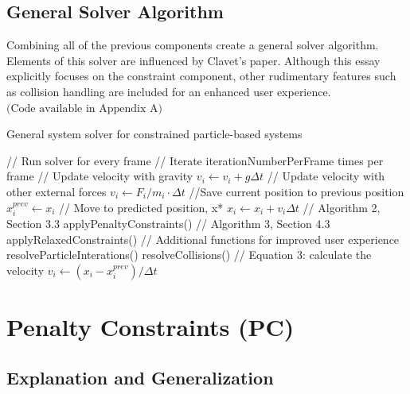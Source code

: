 \documentclass[12pt, letterpaper]{article}
\begin{document}
\subsection{General Solver Algorithm}
Combining all of the previous components create a general solver algorithm. Elements of this solver are influenced by Clavet’s paper. Although this essay explicitly focuses on the constraint component, other rudimentary features such as collision handling are included for an enhanced user experience. $\text{(Code available in Appendix A)}$
\begin{algorithm}[H]
\caption{General system solver for constrained particle-based systems}
\begin{algorithmic}[1]
\STATE // Run solver for every frame
\LOOP 
    \STATE // Iterate iterationNumberPerFrame times per frame
            \STATE // Update velocity with gravity
            \STATE $v_{i} \leftarrow v_{i} + g\Delta t$
            \STATE // Update velocity with other external forces
            \STATE $v_{i} \leftarrow F_{i}/m_{i} \cdot \Delta t$
            \STATE //Save current position to previous position
            \STATE $x_{i}^{prev} \leftarrow x_{i}$
            \STATE // Move to predicted position, x*
            \STATE $x_{i} \leftarrow x_{i} + v_{i}\Delta t$
        \ENDFOR
        \STATE // Algorithm 2, Section 3.3
        \STATE applyPenaltyConstraints()
        \STATE // Algorithm 3, Section 4.3
        \STATE applyRelaxedConstraints()
        \STATE // Additional functions for improved user experience
        \STATE resolveParticleInterations()
        \STATE resolveCollisions()
        \STATE // Equation 3: calculate the velocity
            \STATE $v_{i} \leftarrow (x_{i} - x_{i}^{prev})/\Delta t$
        \ENDFOR
    \ENDFOR
\ENDLOOP
\end{algorithmic}
\end{algorithm}
\section{Penalty Constraints (PC)}
\subsection{Explanation and Generalization}
\end{document}
